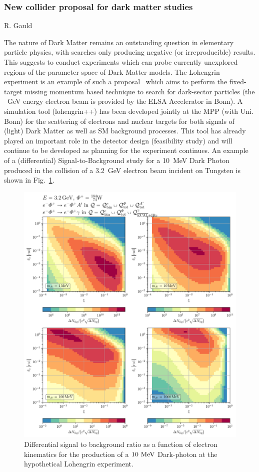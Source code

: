 \documentclass{FBR_Bericht_2025}
\begin{document}
\begin{refsection}
\subsubsection{New collider proposal for dark matter studies}
\begin{Namen}
R. Gauld
\end{Namen}
The nature of Dark Matter remains an outstanding question in elementary particle physics, with searches only producing negative (or irreproducible) results.
This suggests to conduct experiments which can probe currently unexplored regions of the parameter space of Dark Matter models.
The Lohengrin experiment is an example of such a proposal~\cite{Bechtle:2024atq} which aims to perform the fixed-target missing momentum based technique to search for dark-sector particles (the ~GeV energy electron beam is provided by the ELSA Accelerator in Bonn).
A simulation tool (lohengrin++) has been developed jointly at the MPP (with Uni. Bonn) for the scattering of electrons and nuclear targets for both signals of (light) Dark Matter as well as SM background processes. This tool has already played an important role in the detector design (feasibility study) and will continue to be developed as planning for the experiment continues. 
An example of a (differential) Signal-to-Background study for a 10~MeV Dark Photon produced in the collision of a 3.2~GeV electron beam incident on Tungsten is shown in Fig.~\ref{fig:lohengrin}.
\begin{figure}[h!]
\begin{center}
\includegraphics[width=0.95\linewidth]{plots/SB_Lohengrin.pdf}
\caption{Differential signal to background ratio as a function of electron kinematics for the production of a $10~{\rm MeV}$ Dark-photon at the hypothetical Lohengrin experiment.}
\label{fig:lohengrin}
\end{center}
\end{figure}



\end{refsection}
\end{document}
